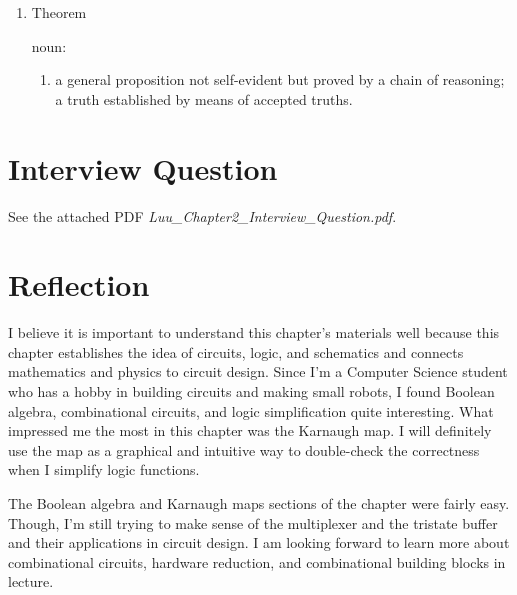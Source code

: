 \documentclass[12pt]{article}
\begin{document}
\begin{enumerate}
    \item{Theorem}

    noun:

    \begin{enumerate}
        \item a general proposition not self-evident but proved by a chain of reasoning; a truth established by means of accepted truths.
    \end{enumerate}
\end{enumerate}

\section{Interview Question}

See the attached PDF \textit{Luu\_Chapter2\_Interview\_Question.pdf}.

\section{Reflection}

I believe it is important to understand this chapter's materials well because this chapter establishes the idea of circuits, logic, and schematics and connects mathematics and physics to circuit design. Since I'm a Computer Science student who has a hobby in building circuits and making small robots, I found Boolean algebra, combinational circuits, and logic simplification quite interesting. What impressed me the most in this chapter was the Karnaugh map. I will definitely use the map as a graphical and intuitive way to double-check the correctness when I simplify logic functions.

The Boolean algebra and Karnaugh maps sections of the chapter were fairly easy. Though, I'm still trying to make sense of the multiplexer and the tristate buffer and their applications in circuit design. I am looking forward to learn more about combinational circuits, hardware reduction, and combinational building blocks in lecture.

\end{document}
